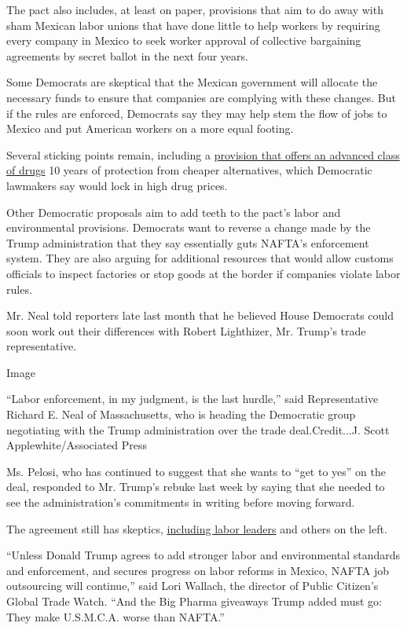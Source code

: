 The pact also includes, at least on paper, provisions that aim to do
away with sham Mexican labor unions that have done little to help
workers by requiring every company in Mexico to seek worker approval of
collective bargaining agreements by secret ballot in the next four
years.

Some Democrats are skeptical that the Mexican government will allocate
the necessary funds to ensure that companies are complying with these
changes. But if the rules are enforced, Democrats say they may help stem
the flow of jobs to Mexico and put American workers on a more equal
footing.

Several sticking points remain, including a
\href{https://www.nytimes3xbfgragh.onion/2019/03/21/us/politics/nafta-drug-prices.html}{provision
that offers an advanced class of drugs} 10 years of protection from
cheaper alternatives, which Democratic lawmakers say would lock in high
drug prices.

Other Democratic proposals aim to add teeth to the pact's labor and
environmental provisions. Democrats want to reverse a change made by the
Trump administration that they say essentially guts NAFTA's enforcement
system. They are also arguing for additional resources that would allow
customs officials to inspect factories or stop goods at the border if
companies violate labor rules.

Mr. Neal told reporters late last month that he believed House Democrats
could soon work out their differences with Robert Lighthizer, Mr.
Trump's trade representative.

Image

``Labor enforcement, in my judgment, is the last hurdle,'' said
Representative Richard E. Neal of Massachusetts, who is heading the
Democratic group negotiating with the Trump administration over the
trade deal.Credit...J. Scott Applewhite/Associated Press

Ms. Pelosi, who has continued to suggest that she wants to ``get to
yes'' on the deal, responded to Mr. Trump's rebuke last week by saying
that she needed to see the administration's commitments in writing
before moving forward.

The agreement still has skeptics,
\href{https://www.nytimes3xbfgragh.onion/2019/05/29/us/politics/pelosi-trump-nafta-deal.html}{including
labor leaders} and others on the left.

``Unless Donald Trump agrees to add stronger labor and environmental
standards and enforcement, and secures progress on labor reforms in
Mexico, NAFTA job outsourcing will continue,'' said Lori Wallach, the
director of Public Citizen's Global Trade Watch. ``And the Big Pharma
giveaways Trump added must go: They make U.S.M.C.A. worse than NAFTA.''

